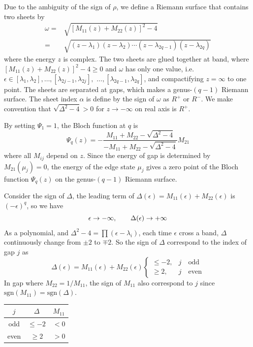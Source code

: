 \documentclass[12pt,a4paper]{article}
\begin{document}
    Due to the ambiguity of the sign of $\rho$, we define a Riemann surface that contains two sheets by
    \begin{equation}
    \label{eq:Riemann}
    \begin{aligned}
        \omega
        = & \sqrt{\left[M_{11}(z)+M_{22}(z)\right]^2 - 4} \\
        = & \sqrt{(z-\lambda_1)(z-\lambda_2)\cdots(z-\lambda_{2q-1})(z-\lambda_{2q})}
    \end{aligned}
    \end{equation}
    where the energy $z$ is complex. The two sheets are glued together at band, where $\left[M_{11}(z)+M_{22}(z)\right]^2 - 4 \geq 0$ and $\omega$ has only one value, i.e. $\epsilon \in [\lambda_1, \lambda_2], \dots, [\lambda_{2j-1}, \lambda_{2j}],$ $\dots, [\lambda_{2q-1}, \lambda_{2q}]$, and compactifying $z = \infty$ to one point. The sheets are separated at gaps, which makes a genus-$(q-1)$ Riemann surface. The sheet index $\alpha$ is define by the sign of $\omega$ as $R^+$ or $R^-$. We make convention that $\sqrt{\Delta^2-4}>0$ for $z\to-\infty$ on real axis is $R^+$.

    By setting $\Psi_1=1$, the Bloch function at $q$ is
    \begin{equation}
    \label{eq:Psi_q}
        \Psi_q(z) =
        -\frac{M_{11}+M_{22} - \sqrt{\Delta^2-4}}{-M_{11}+M_{22} - \sqrt{\Delta^2-4}} M_{21}
    \end{equation}
    where all $M_{ij}$ depend on $z$. Since the energy of gap is determined by $M_{21}(\mu_j) = 0$, the energy of the edge state $\mu_j$ gives a zero point of the Bloch function $\Psi_q(z)$ on the genus-$(q-1)$ Riemann surface.



    Consider the sign of $\Delta$, the leading term of $\Delta(\epsilon) = M_{11}(\epsilon) + M_{22}(\epsilon)$ is $(-\epsilon)^q$, so we have
    \[
        \epsilon \to -\infty, \qquad \Delta(\epsilon) \to +\infty \\
    \]
    As a polynomial, and $\Delta^2 - 4 = \prod (\epsilon-\lambda_i)$, each time $\epsilon$ cross a band, $\Delta$ continuously change from $\pm2$ to $\mp2$. So the sign of $\Delta$ correspond to the index of gap $j$ as
    \[
        \Delta(\epsilon) = M_{11}(\epsilon) + M_{22}(\epsilon)
        \begin{cases}
            \leq -2,    & j \quad \text{odd} \\
            \geq 2,     & j \quad \text{even}
        \end{cases}
    \]
    In gap where $M_{22}=1/M_{11}$, the sign of $M_{11}$ also correspond to $j$ since $\mathrm{sgn}(M_{11})= \mathrm{sgn}(\Delta)$.
    \begin{table}[H]
        \centering
        \begin{tabular}{*{3}{c}}
            \toprule
            $j$    & $\Delta$   & $M_{11}$ \\
            \midrule
            odd    & $\leq -2$  & $< 0$ \\
            even   & $\geq 2$   & $> 0$ \\
            \bottomrule
        \end{tabular}
    \end{table}
\end{document}
